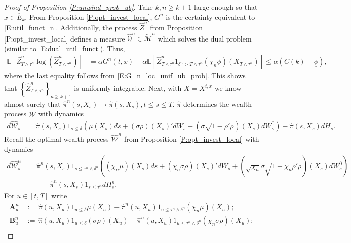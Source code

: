 \documentclass[11pt, letterpaper]{amsart}
\theoremstyle{definition}
\theoremstyle{remark}
\numberwithin{equation}{section}
\newcommand{\We}{\mathcal{W}}
\newcommand{\hwe}{\hat{\We}}
\newcommand{\hz}{\hat{Z}}
\newcommand{\hqprob}{\hat{\qprob}}
\newcommand{\hpi}{\hat{\pi}}
\newcommand{\qprob}{\mathbb{Q}}
\newcommand{\esp}{\mathbb{E}}
\newcommand{\espalt}[2]{\esp^{#1}\bra{#2}}
\newcommand{\tM}{\widetilde{\mathcal{M}}}
\newcommand{\dfn}{\, := \,}
\newcommand{\bra}[1]{\left[#1\right]}
\newcommand{\cbra}[1]{\left\{#1\right\}}
\newcommand{\ul}[1]{\underline{#1}}
\newcommand{\ol}[1]{\overline{#1}}
\begin{document}
\begin{proof}[Proof of Proposition \ref{P:unwind_prob_ub}]
Take $k,n\geq k+1$ large enough so that $x\in\ol{E}_k$. From Proposition \ref{P:opt_invest_local}, $G^n$ is the certainty equivalent to \eqref{E:util_funct_n}.  Additionally, the process $\hz^n$ from Proposition \ref{P:opt_invest_local} defines a measure $\hqprob^n\in\tM^n$ which solves the dual problem (similar to \eqref{E:dual_util_funct}). Thus,
\begin{equation}\label{E:bdd_rel_ent}
\begin{split}
\espalt{}{\hz^n_{T\wedge\tau^n}\log\left(\hz^n_{T\wedge\tau^n}\right)} &= \alpha G^n(t,x) - \alpha \espalt{}{\hz^n_{T\wedge\tau^n}1_{\delta^n>T\wedge\tau^n}(\chi_n\phi)(X_{T\wedge\tau^n})} \leq \alpha(C(k) -\ul{\phi}),
\end{split}
\end{equation}
where the last equality follows from \eqref{E:G_n_loc_unif_ub_prob}. This shows that $\cbra{\hz^n_{T\wedge\tau^n}}_{n\geq k+1}$ is uniformly integrable.  Next, with $X=X^{t,x}$ we know almost surely that $\hpi^n(s,X_s) \rightarrow \hpi(s,X_s), t\leq s\leq T$. $\hpi$ determines the wealth process $\hwe$ with dynamics
\begin{equation*}
\begin{split}
d\hwe_s &= \hpi(s,X_s)1_{s\leq \delta}\left(\mu(X_s)ds + (\sigma\rho)(X_s)'dW_s + (\sigma\sqrt{1-\rho'\rho})(X_s)dW^0_s\right) - \hpi(s,X_s)dH_s.
\end{split}
\end{equation*}
Recall the optimal wealth process $\hwe^{n}$ from Proposition \ref{P:opt_invest_local} with dynamics
\begin{equation*}
\begin{split}
d\hwe^n_s &= \hpi^n(s,X_s)1_{s\leq \tau^n\wedge\delta^n}\left((\chi_n\mu)(X_s)ds + (\chi_n\sigma\rho)(X_s)'dW_s + (\sqrt{\chi_n}\sigma\sqrt{1-\chi_n\rho'\rho})(X_s)dW^0_s\right)\\
&\qquad -\hpi^n(s,X_s)1_{s\leq\tau^n} dH^n_s.
\end{split}
\end{equation*}
For $u\in [t,T]$ write
\begin{equation*}
\begin{split}
\mathbf{A}^n_u &\dfn \hpi(u,X_u)1_{u\leq \delta}\mu(X_u) - \hpi^n(u,X_u)1_{u\leq \tau^n\wedge\delta^n}(\chi_n\mu)(X_u);\\
\mathbf{B}^n_u &\dfn \hpi(u,X_u)1_{u\leq \delta}(\sigma\rho)(X_u) - \hpi^n(u,X_u)1_{u\leq \tau^n\wedge\delta^n}(\chi_n\sigma\rho)(X_u);\\

\end{split}
\end{equation*}
\end{proof}
\end{document}
